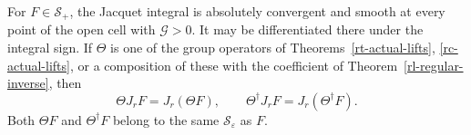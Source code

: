 \begin{lemma}\label{jf-pointwise-smooth}
For \(F\in\mathscr S_+\), the Jacquet integral is absolutely
convergent and smooth at every point of the open cell with
\(\mathcal G>0\).  It may be differentiated there under the
integral sign.  If \(\Theta\) is one of the group operators
of Theorems~\ref{rt-actual-lifts}, \ref{rc-actual-lifts},
or a composition of these with the coefficient of
Theorem~\ref{rl-regular-inverse}, then
\begin{equation}\label{jf-commute}
             \Theta J_rF=J_r(\Theta F),\qquad
             \Theta^\dagger J_rF=J_r(\Theta^\dagger F).
\end{equation}
Both \(\Theta F\) and \(\Theta^\dagger F\) belong to the
same \(\mathscr S_\varepsilon\) as \(F\).
\end{lemma}

